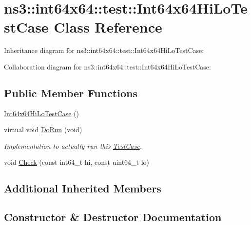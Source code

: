 \hypertarget{classns3_1_1int64x64_1_1test_1_1Int64x64HiLoTestCase}{}\section{ns3\+:\+:int64x64\+:\+:test\+:\+:Int64x64\+Hi\+Lo\+Test\+Case Class Reference}
\label{classns3_1_1int64x64_1_1test_1_1Int64x64HiLoTestCase}


Inheritance diagram for ns3\+:\+:int64x64\+:\+:test\+:\+:Int64x64\+Hi\+Lo\+Test\+Case\+:


Collaboration diagram for ns3\+:\+:int64x64\+:\+:test\+:\+:Int64x64\+Hi\+Lo\+Test\+Case\+:
\subsection*{Public Member Functions}
\begin{DoxyCompactItemize}
\item 
\hyperlink{classns3_1_1int64x64_1_1test_1_1Int64x64HiLoTestCase_a3b6468dc5d19a34abcf1d3b6e8063dc7}{Int64x64\+Hi\+Lo\+Test\+Case} ()
\item 
virtual void \hyperlink{classns3_1_1int64x64_1_1test_1_1Int64x64HiLoTestCase_a39b6f96a84d930273d8b491a167ce103}{Do\+Run} (void)
\begin{DoxyCompactList}\small\item\em Implementation to actually run this \hyperlink{classns3_1_1TestCase}{Test\+Case}. \end{DoxyCompactList}\item 
void \hyperlink{classns3_1_1int64x64_1_1test_1_1Int64x64HiLoTestCase_a9490df4c4737e15e7c7dac4dcadbeec9}{Check} (const int64\+\_\+t hi, const uint64\+\_\+t lo)
\end{DoxyCompactItemize}
\subsection*{Additional Inherited Members}


\subsection{Constructor \& Destructor Documentation}
